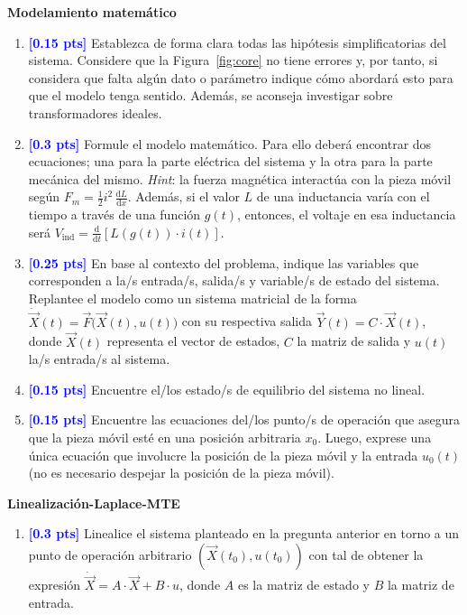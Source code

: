 \documentclass[
  11pt,
  letterpaper,
   addpoints,
  ]{exam}
\begin{document}
\begin{questions}
\question \textbf{Modelamiento matemático}
\begin{enumerate}
  \item \textcolor{blue}{\textbf{[0.15 pts]}} Establezca de forma clara todas las hipótesis simplificatorias del sistema. Considere que la Figura~\ref{fig:core} no tiene errores y, por tanto, si considera que falta algún dato o parámetro indique cómo abordará esto para que el modelo tenga sentido. Además, se aconseja investigar sobre transformadores ideales.

  \item \textcolor{blue}{\textbf{[0.3 pts]}} Formule el modelo matemático. Para ello deberá encontrar dos ecuaciones; una para la parte eléctrica del sistema y la otra para la parte mecánica del mismo. \emph{Hint}: la fuerza magnética interactúa con la pieza móvil según $F_m = \frac{1}{2} i^2\, \frac{\mathrm{d}L}{\mathrm{d}x}$. Además, si el valor $L$ de una inductancia varía con el tiempo a través de una función $g(t)$, entonces, el voltaje en esa inductancia será $V_{\text{ind}} = \frac{\mathrm{d}}{\mathrm{d}t}\left[L(g(t)) \cdot i(t)\right]$.

  \item \textcolor{blue}{\textbf{[0.25 pts]}} En base al contexto del problema, indique las variables que corresponden a la/s entrada/s, salida/s y variable/s de estado del sistema. Replantee el modelo como un sistema matricial de la forma $\dot{\vec{X}}(t) = \vec{F}\big(\vec{X}(t), u(t)\big)$ con su respectiva salida $\vec{Y}(t) = C \cdot \vec{X}(t)$, donde $\vec{X}(t)$ representa el vector de estados, $C$ la matriz de salida y $u(t)$ la/s entrada/s al sistema.

  \item \textcolor{blue}{\textbf{[0.15 pts]}} Encuentre el/los estado/s de equilibrio del sistema no lineal.

  \item \textcolor{blue}{\textbf{[0.15 pts]}} Encuentre las ecuaciones del/los punto/s de operación que asegura que la pieza móvil esté en una posición arbitraria $x_0$. Luego, exprese una única ecuación que involucre la posición de la pieza móvil y la entrada $u_0(t)$ (no es necesario despejar la posición de la pieza móvil).
\end{enumerate}

\question \textbf{Linealización-Laplace-MTE}

\begin{enumerate}
  \item \textcolor{blue}{\textbf{[0.3 pts]}} Linealice el sistema planteado en la pregunta anterior en torno a un punto de operación arbitrario $(\vec{X}(t_0), u(t_0))$ con tal de obtener la expresión $\dot{\vec{X}} = A \cdot \vec{X} + B \cdot u$, donde $A$ es la matriz de estado y $B$ la matriz de entrada.


\end{enumerate}
\end{questions}
\end{document}
